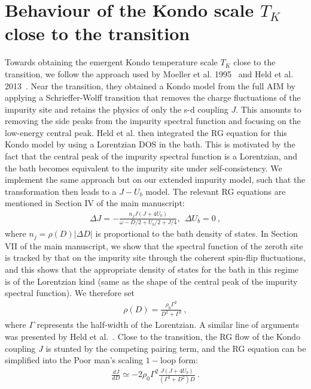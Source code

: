 \documentclass{iopart}
\begin{document}
\section{Behaviour of the Kondo scale $T_K$ close to the transition}
\label{app-Tk}
Towards obtaining the emergent Kondo temperature scale $T_K$ close to the transition, we follow the approach used by Moeller et al. 1995~\cite{moeller_1995} and Held et al. 2013~\cite{held_2013}. Near the transition, they obtained a Kondo model from the full AIM by applying a Schrieffer-Wolff transition that removes the charge fluctuations of the impurity site and retains the physics of only the s-d coupling \(J\). This amounts to removing the side peaks from the impurity spectral function and focusing on the low-energy central peak. Held et al. then integrated the RG equation for this Kondo model by using a Lorentzian DOS in the bath. This is motivated by the fact that the central peak of the impurity spectral function is a Lorentzian, and the bath becomes equivalent to the impurity site under self-consistency. We implement the same approach but on our extended impurity model, such that the transformation then leads to a \(J-U_b\) model. The relevant RG equations are mentioned in Section IV of the main manuscript:
\begin{eqnarray}
	\Delta J = -\frac{n_j J\left(J + 4U_b\right)}{\omega - D/2 + U_b/2 + J/4},~~ \Delta U_b = 0~,
\end{eqnarray}
where \(n_j = \rho(D)|\Delta D|\) is proportional to the bath density of states. In Section VII of the main manuscript, we show that the spectral function of the zeroth site is tracked by that on the impurity site through the coherent spin-flip fluctuations, and this shows that the appropriate density of states for the bath in this regime is of the Lorentzian kind (same as the shape of the central peak of the impurity spectral function). We therefore set
\begin{eqnarray}
	\rho(D) = \frac{\rho_0 \Gamma^2}{D^2 + \Gamma^2}~,
\end{eqnarray}
where \(\Gamma\) represents the half-width of the Lorentzian. A similar line of arguments was presented by Held et al.~\cite{held_2013}. Close to the transition, the RG flow of the Kondo coupling \(J\) is stunted by the competing pairing term, and the RG equation can be simplified into the Poor man's scaling \(1-\)loop form:
\begin{eqnarray}
	\frac{d J}{d D} \simeq -2\rho_0 \Gamma^2\frac{J\left(J + 4U_b\right)}{\left( \Gamma^2 + D^2 \right) D}~.
\end{eqnarray}
\end{document}

